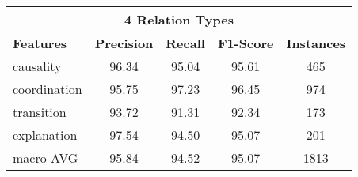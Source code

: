 \begin{table}[ht]
\centering
\begin{tabular}{|l|c|c|c|c|}
\hline

\multicolumn{5}{|c|}{4 Relation Types}                                              \\ \hline
\bf Features            & \bf Precision & \bf Recall & \bf F1-Score & \bf Instances \\ \hline
    causality           &     96.34     &     95.04  &     95.61    &     465       \\ \hline
    coordination        &     95.75     &     97.23  &     96.45    &     974       \\ \hline
    transition          &     93.72     &     91.31  &     92.34    &     173       \\ \hline
    explanation         &     97.54     &     94.50  &     95.07    &     201       \\ \hline
    macro-AVG           &     95.84     &     94.52  &     95.07    &     1813      \\ \hline


\end{tabular}
\end{table}

